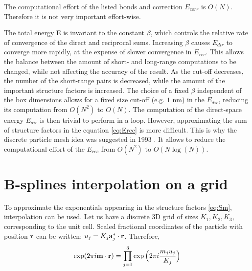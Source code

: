 \documentclass[12pt,a4paper]{report}
\newcommand{\draft}[1]{#1}
\begin{document}

The computational effort of the listed bonds and correction $E_{corr}$ is $O(N)$. Therefore it is not very important effort-wise.

The total energy E is invariant to the constant $\beta$, which
controls the relative rate of convergence of the direct and
reciprocal sums. Increasing $\beta$ causes $E_{dir}$ to converge more
rapidly, at the expense of slower convergence in $E_{rec}$.
This allows the balance between the amount of short- and long-range computations to be changed, while not affecting the accuracy of the result. As the cut-off decreases, the number of the short-range pairs is decreased, while the amount of the important structure factors is increased.
The choice of a fixed $\beta$ independent of the box
dimensions allows for a fixed size cut-off (e.g. $1$ nm) in the
$E_{dir}$, reducing its computation from $O(N^2)$ to $O(N)$.
The computation of the direct-space energy $E_{dir}$ is then trivial to perform in a loop. However, approximating the sum of structure factors in the equation \eqref{eq:Erec} is more difficult. This is why the discrete particle mesh idea was suggested in 1993 \cite{pme}. It allows to reduce the computational effort of the $E_{rec}$ from $O(N^2)$ to $O(N \log (N))$.


\section{B-splines interpolation on a grid}
To approximate the exponentials appearing in the structure factors \eqref{eq:Sm}, interpolation can be used. Let us have a discrete 3D grid of sizes $K_1, K_2, K_3$, corresponding to the unit cell. Scaled fractional coordinates of the particle with position $\bold{r}$ can be written: $u_j = K_j \bold{a}_j^*\cdot  \bold{r}$. 
Therefore, 
\[\exp(2\pi i\bold{m}\cdot\bold{r}) = \prod\limits_{j=1}^3\exp\Big(2\pi i\frac{m_j u_j}{K_j}\Big)\]


\end{document}
